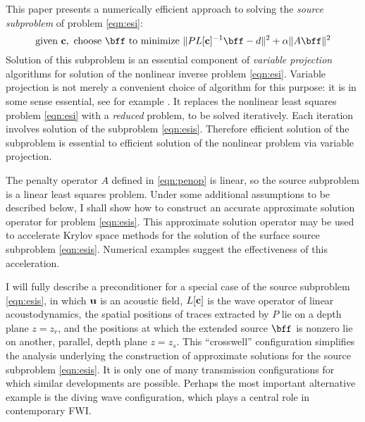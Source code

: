 This paper presents a numerically efficient approach to solving the
{\em source subproblem} of problem \ref{eqn:esi}:
\begin{equation}
\label{eqn:esis}
\mbox{given } {\bf c}, \mbox{ choose } \bff \mbox{ to minimize }
\|PL[{\bf c}]^{-1}\bff -d \|^2 + \alpha \|A\bff\|^2 
\end{equation}
Solution of this subproblem is an essential component of {\em variable
  projection} algorithms for solution of the nonlinear inverse problem
\ref{eqn:esi}. Variable projection is not merely a convenient choice
of algorithm for this purpose: it is in some sense essential, see for
example \cite{Symes:SEG20}. It replaces the nonlinear
least squares problem \ref{eqn:esi} with a {\em reduced} problem, to
be solved iteratively. Each iteration involves solution of the
subproblem \ref{eqn:esis}. Therefore efficient solution of the
subproblem is essential to efficient solution of the nonlinear problem
via variable projection.

The penalty operator $A$ defined in \ref{eqn:penop} is linear, so the source
subproblem is a linear least squares problem. Under some additional
assumptions to be described below, I shall show how to construct an
accurate approximate solution operator for problem
\ref{eqn:esis}. This approximate solution operator may be used to
accelerate Krylov space methods for the solution of the surface source
subproblem \ref{eqn:esis}. Numerical examples suggest the
effectiveness of this acceleration.

I will fully describe a preconditioner for a special
case of the source subproblem \ref{eqn:esis}, in which ${\bf u}$ is an
acoustic field, $L[{\bf c}]$ is the wave operator of linear
acoustodynamics, the spatial positions of traces extracted by $P$ lie
on a depth plane $z=z_r$, and the positions at which the extended
source $\bff$ is nonzero lie on another, parallel, depth plane $z=z_s$. 
This
``crosswell'' configuration simplifies the analysis underlying the
construction of approximate solutions for the source subproblem
\ref{eqn:esis}. It is only one of many transmission configurations for
which similar developments are possible. Perhaps the most important
alternative example is the diving wave configuration, which plays a
central role in contemporary FWI. 

